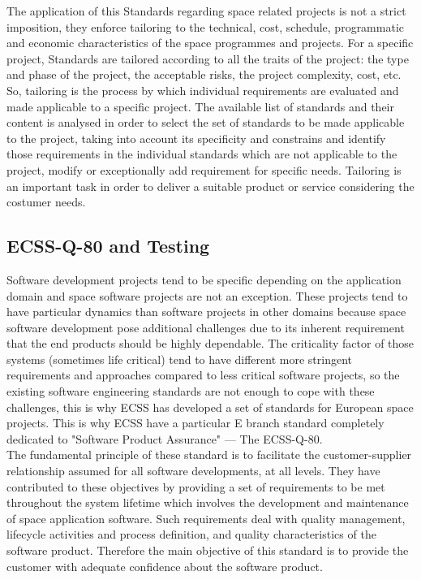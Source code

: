 The application of this Standards regarding space related projects is not a strict imposition, they enforce
tailoring to the technical, cost, schedule, programmatic and economic characteristics of the space programmes and projects.
For a specific project, Standards are tailored according to all the traits of the project: the type and 
phase of the project, the acceptable risks, the project complexity, cost, etc.
So, tailoring is the process by which individual requirements are evaluated and made applicable to a specific project.
The available list of standards and their content is analysed in order to select the set of standards to be made applicable to the project, taking 
into account its specificity and constrains and identify those requirements in the individual standards which are not 
applicable to the project, modify or exceptionally add requirement for specific needs\cite{ecss-s-st-00c}.
Tailoring is an important task in order to deliver a suitable product or service considering the costumer needs.

\subsection{ECSS-Q-80 and Testing}\label{sec:stand}
Software development projects tend to be specific depending on the application domain and 
space software projects are not an exception. These projects tend to have particular dynamics than software projects
in other domains because space software development pose additional challenges due to its inherent
requirement that the end products should be highly dependable.
The criticality factor of those systems (sometimes life critical) tend to have different more stringent requirements and approaches 
compared to less critical software projects, so
the existing software engineering standards are not enough to cope with these challenges, this is why \ac{ECSS} has developed a set of standards for European
space projects\cite{Ahmad2010AgileECSS,10.1109/SESS.1997.595952}.
This is why \ac{ECSS} have a particular E branch standard completely dedicated to "Software Product Assurance" --- The ECSS-Q-80\cite{ecss-q-st-80c}.\\

The fundamental principle of these standard is to facilitate the
customer-supplier relationship assumed for all software developments, at all levels.
They have contributed to these objectives by providing a set of requirements to be
met throughout the system lifetime which involves the development and
maintenance of space application software. Such requirements deal with quality
management, lifecycle activities and process definition, and quality
characteristics of the software product\cite{Mattiello-FranciscoSanAmbJogCos:2007:BrSoIn}.
Therefore the main objective of this standard is to provide the customer with adequate confidence about the software product.\\

